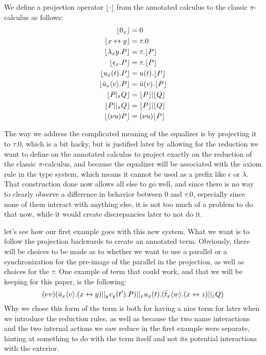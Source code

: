 \begin{definition}
We define a projection operator $\lfloor\cdot\rfloor$ from the annotated calculus to the classic $\pi$-calculus as follows:\\
\begin{align*}
\lfloor 0_x \rfloor &= 0 \\
\lfloor x \leftrightarrow y \rfloor &= \tau.0 \\
\lfloor \lambda_xy.P \rfloor &= \tau.\lfloor P \rfloor \\
\lfloor \epsilon_x.P \rfloor &= \tau.\lfloor P \rfloor \\
\lfloor u_x(t).P \rfloor &= u(t).\lfloor P \rfloor \\
\lfloor \bar{u}_x\langle v\rangle.P \rfloor &= \bar{u}(v).\lfloor P \rfloor \\
\lfloor P |_x Q \rfloor &= \lfloor P \rfloor | \lfloor Q \rfloor \\
\lfloor P ||_x Q \rfloor &= \lfloor P \rfloor | \lfloor Q \rfloor \\
\lfloor (\nu u)P \rfloor &= (\nu u)\lfloor P \rfloor
\end{align*}
\end{definition}

\remark The way we address the complicated meaning of the equalizer is by projecting it to $\tau.0$, which is a bit hacky, but is justified later by allowing for the reduction we want to define on the annotated calculus to project exactly on the reduction of the classic $\pi$-calculus, and because the equalizer will be associated with the axiom rule in the type system, which means it cannot be used as a prefix like $\epsilon$ or $\lambda$. That construction done now allows all else to go well, and since there is no way to clearly observe a difference in behavior between $0$ and $\tau.0$, especially since none of them interact with anything else, it is not too much of a problem to do that now, while it would create discrepancies later to not do it.

\example let's see how our first example goes with this new system. What we want is to follow the projection backwards to create an annotated term. Obviously, there will be choices to be made as to whether we want to use a parallel or a synchronization for the pre-image of the parallel in the projection, as well as choices for the $\tau$. One example of term that could work, and that we will be keeping for this paper, is the following:
\[(\nu v)(\bar{u}_x\langle v\rangle.(x\leftrightarrow y) ||_y v_y(t').P) ||_x u_x(t).(\bar{t}_x\langle w\rangle.(x\leftrightarrow z) ||_z Q)\]
Why we chose this form of the term is both for having a nice term for later when we introduce the reduction rules, as well as because the two name interactions and the two internal actions we saw reduce in the first example were separate, hinting at something to do with the term itself and not its potential interactions with the exterior.